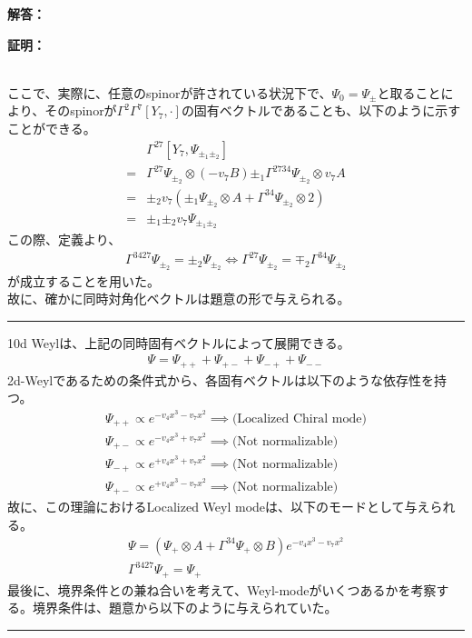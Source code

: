 \documentclass[dvipdfmx,a4paper,10.5pt]{article}
\numberwithin{equation}{section}
\newenvironment{proofbox}
{\begin{prooflabel}\textbf{証明：}\end{prooflabel}\vspace{0.8em}}
{\par\vspace{1em}\hrule\vspace{1em}}
\newenvironment{answerbox}
{\begin{prooflabel}\textbf{解答：}\end{prooflabel}\vspace{0.8em}}
{\par\vspace{1em}\hrule\vspace{1em}}
\begin{document}
\begin{answerbox}
\begin{proofbox}
        \\
        ここで、実際に、任意のspinorが許されている状況下で、$\Psi_{0}=\Psi_{\pm}$と取ることにより、そのspinorが$\Gamma^{2}\Gamma^{7}[Y_{7},\cdot]$の固有ベクトルであることも、以下のように示すことができる。
        \begin{align*}
            &\Gamma^{27}[Y_{7},\Psi_{\pm_{1}\pm_{2}}]\\
            =&\Gamma^{27}\Psi_{\pm_{2}}\otimes (-v_{7}B)\pm_{1}\Gamma^{2734}\Psi_{\pm_{2}}\otimes v_{7}A\\
            =&\pm_{2}v_{7}(\pm_{1}\Psi_{\pm_{2}}\otimes A + \Gamma^{34}\Psi_{\pm_{2}}\otimes 2)\\
            =&\pm_{1}\pm_{2}v_{7}\Psi_{\pm_{1}\pm_{2}}
        \end{align*}
        この際、定義より、
        \begin{gather*}
            \Gamma^{3427}\Psi_{\pm_{2}}=\pm_{2}\Psi_{\pm_{2}}
        \iff \Gamma^{27}\Psi_{\pm_{2}}=\mp_{2}\Gamma^{34}\Psi_{\pm_{2}}  
        \end{gather*}
        が成立することを用いた。\\
        故に、確かに同時対角化ベクトルは題意の形で与えられる。
    \end{proofbox}
    10d Weylは、上記の同時固有ベクトルによって展開できる。
    \begin{align*}
        \Psi =\Psi_{++}+\Psi_{+-}+\Psi_{-+}+\Psi_{--}
    \end{align*}
    2d-Weylであるための条件式から、各固有ベクトルは以下のような依存性を持つ。
    \begin{gather*}
        \Psi_{++}\propto e^{-v_{4}x^{3}-v_{7}x^{2}} \implies \text{(Localized Chiral mode)}\\
        \Psi_{+-}\propto e^{-v_{4}x^{3}+v_{7}x^{2}} \implies \text{(Not normalizable)}\\
        \Psi_{-+}\propto e^{+v_{4}x^{3}+v_{7}x^{2}} \implies \text{(Not normalizable)}\\
        \Psi_{+-}\propto e^{+v_{4}x^{3}-v_{7}x^{2}} \implies \text{(Not normalizable)}
    \end{gather*}
    故に、この理論におけるLocalized Weyl modeは、以下のモードとして与えられる。
    \begin{gather*}
        \Psi = (\Psi_{+}\otimes A + \Gamma^{34}\Psi_{+} \otimes B)e^{-v_{4}x^{3}-v_{7}x^{2}}\\
        \Gamma^{3427}\Psi_{+} =\Psi_{+}
    \end{gather*}
    最後に、境界条件との兼ね合いを考えて、Weyl-modeがいくつあるかを考察する。境界条件は、題意から以下のように与えられていた。

\end{answerbox}
\end{document}
